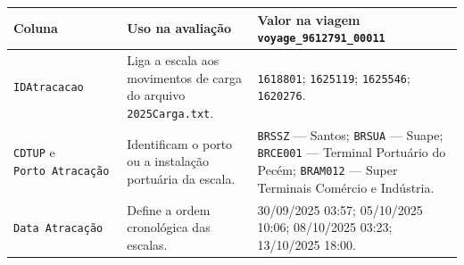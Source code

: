 \documentclass[brazil,]{article}
\begin{document}
\begin{longtable}[]{@{}lll@{}}
\toprule
\begin{minipage}[b]{0.30\columnwidth}\raggedright
Coluna\strut
\end{minipage} & \begin{minipage}[b]{0.30\columnwidth}\raggedright
Uso na avaliação\strut
\end{minipage} & \begin{minipage}[b]{0.30\columnwidth}\raggedright
Valor na viagem \texttt{voyage\_9612791\_00011}\strut
\end{minipage}\tabularnewline
\midrule
\endhead
\begin{minipage}[t]{0.30\columnwidth}\raggedright
\texttt{IDAtracacao}\strut
\end{minipage} & \begin{minipage}[t]{0.30\columnwidth}\raggedright
Liga a escala aos movimentos de carga do arquivo
\texttt{2025Carga.txt}.\strut
\end{minipage} & \begin{minipage}[t]{0.30\columnwidth}\raggedright
\texttt{1618801}; \texttt{1625119}; \texttt{1625546};
\texttt{1620276}.\strut
\end{minipage}\tabularnewline
\begin{minipage}[t]{0.30\columnwidth}\raggedright
\texttt{CDTUP} e \texttt{Porto\ Atracação}\strut
\end{minipage} & \begin{minipage}[t]{0.30\columnwidth}\raggedright
Identificam o porto ou a instalação portuária da escala.\strut
\end{minipage} & \begin{minipage}[t]{0.30\columnwidth}\raggedright
\texttt{BRSSZ} --- Santos; \texttt{BRSUA} --- Suape; \texttt{BRCE001}
--- Terminal Portuário do Pecém; \texttt{BRAM012} --- Super Terminais
Comércio e Indústria.\strut
\end{minipage}\tabularnewline
\begin{minipage}[t]{0.30\columnwidth}\raggedright
\texttt{Data\ Atracação}\strut
\end{minipage} & \begin{minipage}[t]{0.30\columnwidth}\raggedright
Define a ordem cronológica das escalas.\strut
\end{minipage} & \begin{minipage}[t]{0.30\columnwidth}\raggedright
30/09/2025 03:57; 05/10/2025 10:06; 08/10/2025 03:23; 13/10/2025
18:00.\strut
\end{minipage}\tabularnewline

\end{longtable}
\end{document}
